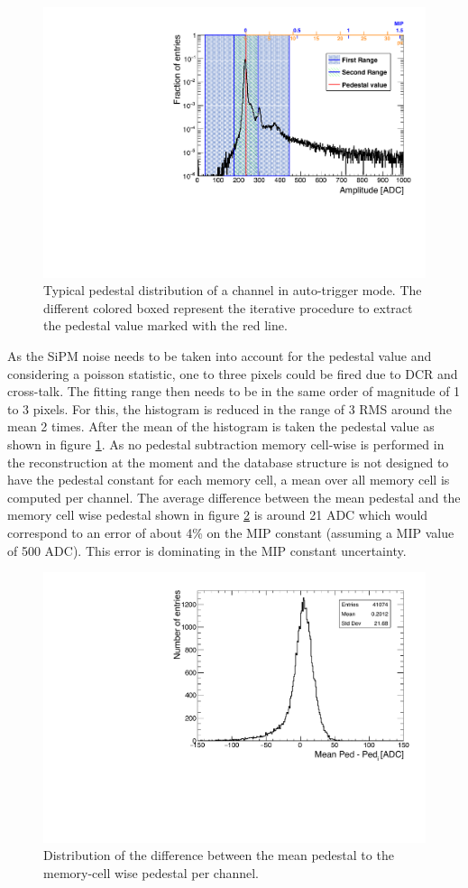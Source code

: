 \begin{figure}[htbp!]
	\centering
	\includegraphics[width=0.7\linewidth]{chap5/fig_EnergyCalib/PedestalExtractionExample.pdf}
	\caption{Typical pedestal distribution of a channel in auto-trigger mode. The different colored boxed represent the iterative procedure to extract the pedestal value marked with the red line.} \label{fig:PedExtraction}
\end{figure}

As the SiPM noise needs to be taken into account for the pedestal value and considering a poisson statistic, one to three pixels could be fired due to DCR and cross-talk. The fitting range then needs to be in the same order of magnitude of 1 to 3 pixels. For this, the histogram is reduced in the range of 3 RMS around the mean 2 times. After the mean of the histogram is taken the pedestal value as shown in figure \ref{fig:PedExtraction}. As no pedestal subtraction memory cell-wise is performed in the reconstruction at the moment and the database structure is not designed to have the pedestal constant for each memory cell, a mean over all memory cell is computed per channel. The average difference between the mean pedestal and the memory cell wise pedestal shown in figure \ref{fig:CompMeanMem} is around 21 ADC which would correspond to an error of about 4\% on the MIP constant (assuming a MIP value of 500 ADC). This error is dominating in the MIP constant uncertainty.

\begin{figure}[htbp!]
	\centering
	\includegraphics[width=0.7\linewidth]{chap5/fig_EnergyCalib/ComparisonMeanPedtoMemorycell.pdf}
	\caption{Distribution of the difference between the mean pedestal to the memory-cell wise pedestal per channel.} \label{fig:CompMeanMem}
\end{figure}

